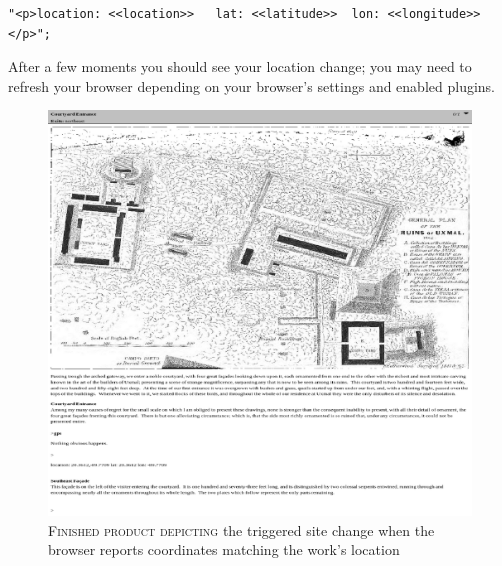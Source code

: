 \begin{lstlisting}
"<p>location: <<location>>   lat: <<latitude>>  lon: <<longitude>></p>";
\end{lstlisting}
After a few moments you should see your location change; you may need to refresh
your browser depending on your browser's settings and enabled plugins. 
\begin{figure}[h]                                                           
\hspace*{-1.75cm} 
 \includegraphics[width=0.9\paperwidth]{./media/images/switch.pdf}%
  \scriptsize{\textsc{\\Finished product depicting} the triggered site change
    when the browser reports coordinates matching the work's location}
  \label{fig:switched}%
\end{figure}


